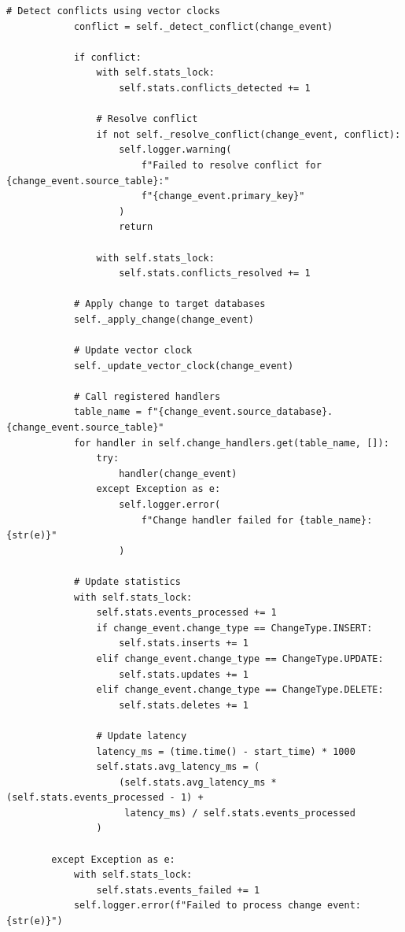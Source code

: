 \begin{lstlisting}[style=python, caption=CDCProcessor with Change Stream Handling]
            # Detect conflicts using vector clocks
            conflict = self._detect_conflict(change_event)

            if conflict:
                with self.stats_lock:
                    self.stats.conflicts_detected += 1

                # Resolve conflict
                if not self._resolve_conflict(change_event, conflict):
                    self.logger.warning(
                        f"Failed to resolve conflict for {change_event.source_table}:"
                        f"{change_event.primary_key}"
                    )
                    return

                with self.stats_lock:
                    self.stats.conflicts_resolved += 1

            # Apply change to target databases
            self._apply_change(change_event)

            # Update vector clock
            self._update_vector_clock(change_event)

            # Call registered handlers
            table_name = f"{change_event.source_database}.{change_event.source_table}"
            for handler in self.change_handlers.get(table_name, []):
                try:
                    handler(change_event)
                except Exception as e:
                    self.logger.error(
                        f"Change handler failed for {table_name}: {str(e)}"
                    )

            # Update statistics
            with self.stats_lock:
                self.stats.events_processed += 1
                if change_event.change_type == ChangeType.INSERT:
                    self.stats.inserts += 1
                elif change_event.change_type == ChangeType.UPDATE:
                    self.stats.updates += 1
                elif change_event.change_type == ChangeType.DELETE:
                    self.stats.deletes += 1

                # Update latency
                latency_ms = (time.time() - start_time) * 1000
                self.stats.avg_latency_ms = (
                    (self.stats.avg_latency_ms * (self.stats.events_processed - 1) +
                     latency_ms) / self.stats.events_processed
                )

        except Exception as e:
            with self.stats_lock:
                self.stats.events_failed += 1
            self.logger.error(f"Failed to process change event: {str(e)}")


\end{lstlisting}
